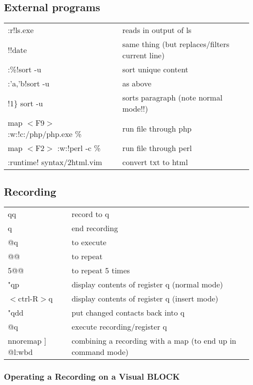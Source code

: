 \subsection{External programs}
\begin{center}
\begin{longtable}{l|l}
 :r!ls.exe & reads in output of ls\\
 !!date & same thing (but replaces/filters current line)\\
 :\%!sort -u & sort unique content\\
 :'a,'b!sort -u & as above\\
 !1\} sort -u & sorts paragraph (note normal mode!!)\\
 map $<$F9$>$ :w:!c:/php/php.exe \% & run file through php\\
 map $<$F2$>$ :w:!perl -c \% & run file through perl\\
 :runtime! syntax/2html.vim & convert txt to html
 \end{longtable}
\end{center}

\subsection{Recording}
\begin{center}
\begin{longtable}{l|l}
qq & record to q\\
q & end recording\\
@q & to execute\\
@@ & to repeat\\
5@@ & to repeat 5 times\\
"qp & display contents of register q (normal mode)\\
$<$ctrl-R$>$q & display contents of register q (insert mode)\\
"qdd & put changed contacts back into q\\
@q & execute recording/register q\\
nnoremap ] @l:wbd & combining a recording with a map (to end up in command mode)
\end{longtable}
\end{center}

 \subsubsection{Operating a Recording on a Visual BLOCK}

